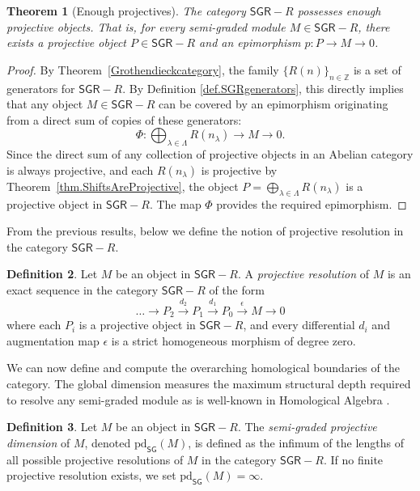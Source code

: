 \documentclass[reqno]{amsart}
\newtheorem{theorem}{Theorem}[section]
\theoremstyle{definition}
\newtheorem{definition}[theorem]{Definition}
\theoremstyle{remark}
\numberwithin{equation}{section}
\begin{document}
\begin{theorem}[Enough projectives]\label{thm.EnoughProjectives}
The category $\mathsf{SGR}-R$ possesses enough projective objects. That is, for every semi-graded module $M \in \mathsf{SGR}-R$, there exists a projective object $P \in \mathsf{SGR}-R$ and an epimorphism $p: P \to M \to 0$.
\end{theorem}
\begin{proof}
By Theorem~\ref{Grothendieckcategory}, the family $\{R(n)\}_{n \in \mathbb{Z}}$ is a set of generators for $\mathsf{SGR}-R$. By Definition \ref{def.SGRgenerators}, this directly implies that any object $M \in \mathsf{SGR}-R$ can be covered by an epimorphism originating from a direct sum of copies of these generators:
\[
\Phi: \bigoplus_{\lambda \in \Lambda} R(n_\lambda) \longrightarrow M \longrightarrow 0.
\]
Since the direct sum of any collection of projective objects in an Abelian category is always projective, and each $R(n_\lambda)$ is projective by Theorem~\ref{thm.ShiftsAreProjective}, the object $P = \bigoplus_{\lambda \in \Lambda} R(n_\lambda)$ is a projective object in $\mathsf{SGR}-R$. The map $\Phi$ provides the required epimorphism.
\end{proof}


From the previous results, below we define the notion of projective resolution in the category $\mathsf{SGR}-R$.

\begin{definition}\label{def.ProjectiveResolution}
Let $M$ be an object in $\mathsf{SGR}-R$. A {\em projective resolution} of $M$ is an exact sequence in the category $\mathsf{SGR}-R$ of the form 
\[
\dots \longrightarrow P_2 \xrightarrow{\ d_2\ } P_1 \xrightarrow{\ d_1\ } P_0 \xrightarrow{\ \epsilon\ } M \longrightarrow 0
\]
where each $P_i$ is a projective object in $\mathsf{SGR}-R$, and every differential $d_i$ and augmentation map $\epsilon$ is a strict homogeneous morphism of degree zero.
\end{definition}

We can now define and compute the overarching homological boundaries of the category. The global dimension measures the maximum structural depth required to resolve any semi-graded module as is well-known in Homological Algebra \cite{Rotman2009, WeibelBook1994}.

\begin{definition}\label{def.projdim}
Let $M$ be an object in $\mathsf{SGR}-R$. The {\em semi-graded projective dimension} of $M$, denoted $\mathrm{pd}_{\mathsf{SG}}(M)$, is defined as the infimum of the lengths of all possible projective resolutions of $M$ in the category $\mathsf{SGR}-R$. If no finite projective resolution exists, we set $\mathrm{pd}_{\mathsf{SG}}(M) = \infty$. 

\end{definition}
\end{document}
